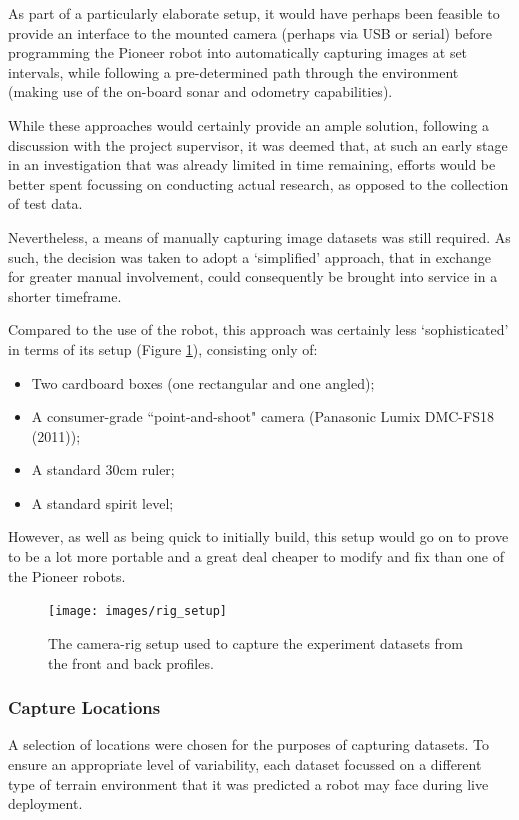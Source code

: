 As part of a particularly elaborate setup, it would have perhaps been feasible to provide an interface to the mounted camera (perhaps via USB or serial) before programming the Pioneer robot into automatically capturing images at set intervals, while following a pre-determined path through the environment (making use of the on-board sonar and odometry capabilities). 

While these approaches would certainly provide an ample solution, following a discussion with the project supervisor, it was deemed that, at such an early stage in an investigation that was already limited in time remaining, efforts would be better spent focussing on conducting actual research, as opposed to the collection of test data.

Nevertheless, a means of manually capturing image datasets was still required. As such, the decision was taken to adopt a `simplified' approach, that in exchange for greater manual involvement, could consequently be brought into service in a shorter timeframe.

Compared to the use of the robot, this approach was certainly less `sophisticated' in terms of its setup (Figure \ref{fig:rig}), consisting only of:

\begin{itemize}
	\item Two cardboard boxes (one rectangular and one angled);
	\item A consumer-grade ``point-and-shoot" camera (Panasonic Lumix DMC-FS18 (2011));
	\item A standard 30cm ruler;
	\item A standard spirit level;
\end{itemize}

However, as well as being quick to initially build, this setup would go on to prove to be a lot more portable and a great deal cheaper to modify and fix than one of the Pioneer robots. 

\begin{figure}[ht!]
\centering
\texttt{[image: images/rig\_setup]}
  \caption{The camera-rig setup used to capture the experiment datasets from the front and back profiles.}
\label{fig:rig}
\end{figure} 

\subsubsection{Capture Locations}

A selection of locations were chosen for the purposes of capturing datasets. To ensure an appropriate level of variability, each dataset focussed on a different type of terrain environment that it was predicted a robot may face during live deployment.

